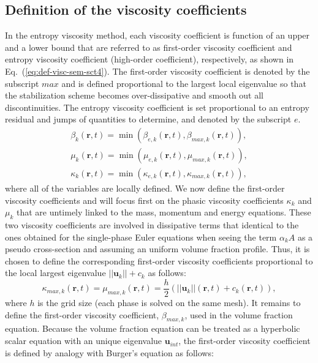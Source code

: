 \documentclass[preprint,10pt]{elsarticle}
\newcommand{\mbold}[1]{\boldsymbol#1}
\newcommand{\eqt}[1]{Eq.~(\ref{#1})}                     %
\begin{document}
\subsection{Definition of the viscosity coefficients}\label{sec:visc-coeff-sem}
In the entropy viscosity method, each viscosity coefficient is function of an upper and a lower bound that are referred to as first-order viscosity coefficient and entropy viscosity coefficient (high-order coefficient), respectively, as shown in \eqt{eq:def-visc-sem-sct4}. The first-order viscosity coefficient is denoted by the subscript $max$ and is defined proportional to the largest local eigenvalue so that the stabilization scheme becomes over-dissipative and smooth out all discontinuities. The entropy viscosity coefficient is set proportional to an entropy residual and jumps of quantities to determine, and denoted by the subscript $e$. 
%
\begin{align}\label{eq:def-visc-sem-sct4}
\beta_k( \mbold r, t) = \min \left( \beta_{e,k}( \mbold r, t), \beta_{max,k} ( \mbold r, t) \right), \nonumber \\
\mu_k( \mbold r, t) = \min \left( \mu_{e,k}( \mbold r, t), \mu_{max,k} ( \mbold r, t) \right),  \\
\kappa_k( \mbold r, t) = \min \left( \kappa_{e,k}( \mbold r, t), \kappa_{max,k} ( \mbold r, t) \right) ,\nonumber 
\end{align}
% 
where all of the variables are locally defined. We now define the first-order viscosity coefficients and will focus first on the phasic viscosity coefficients $\kappa_k$ and $\mu_k$ that are untimely linked to the mass, momentum and energy equations. These two viscosity coefficients are involved in dissipative terms that identical to the ones obtained for the single-phase Euler equations \cite{jlg, Marco_paper_low_mach} when seeing the term $\alpha_k A$ as a pseudo cross-section and assuming an uniform volume fraction profile. Thus, it is chosen to define the corresponding first-order viscosity coefficients proportional to the local largest eigenvalue $|| \mbold u_k || + c_k$ as follows:
%
\begin{equation}\label{eq:def-visc-max-sem-sct4}
\kappa_{max,k}( \mbold r, t) = \mu_{max,k}( \mbold r, t) = \frac{h}{2} \left( || \mbold u_k||( \mbold r, t) + c_k( \mbold r, t) \right),
\end{equation}
%
where $h$ is the grid size (each phase is solved on the same mesh). It remains to define the first-order viscosity coefficient, $\beta_{max,k}$, used in the volume fraction equation. Because the volume fraction equation can be treated as a hyperbolic scalar equation with an unique eigenvalue $\mbold u_{int}$, the first-order viscosity coefficient is defined by analogy with Burger's equation \cite{jlg1, jlg2} as follows:
\end{document}

